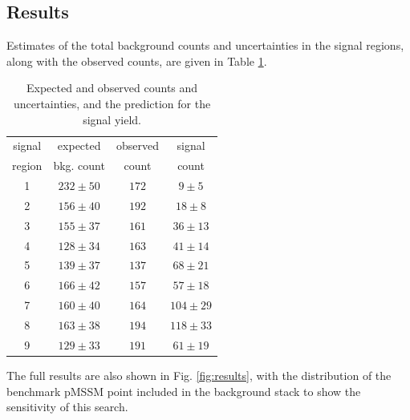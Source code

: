 \subsection{Results}
Estimates of the total background counts and uncertainties in the signal regions, along with the observed counts, are given in Table \ref{tab:results}.  
    \begin{table}[htb]
    \label{tab:preCMS}
    \centering
    \vspace{1ex}
    \begin{tabular}{c|c|c|c}
    \hline
    signal & expected    & observed  & signal  \\
    region & bkg. count    & count   & count  \\
    \hline\hline
1 & $232\pm50$ & $172$ & $9\pm5$\\
2 & $156\pm40$ & $192$ & $18\pm8$\\
3 & $155\pm37$ & $161$ & $36\pm13$\\
4 & $128\pm34$ & $163$ & $41\pm14$\\
5 & $139\pm37$ & $137$ & $68\pm21$\\
6 & $166\pm42$ & $157$ & $57\pm18$\\
7 & $160\pm40$ & $164$ & $104\pm29$\\
8 & $163\pm38$ & $194$ & $118\pm33$\\
9 & $129\pm33$ & $191$ & $61\pm19$\\
    \hline
    \end{tabular}
    \caption{Expected and observed counts and uncertainties, and the prediction for the signal yield.}
        \label{tab:results}
    \end{table}
The full results are also shown in Fig. \ref{fig:results}, with the distribution of the benchmark pMSSM point included in the background stack to show the sensitivity of this search.

